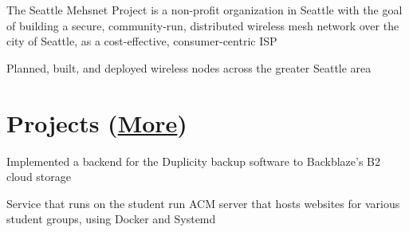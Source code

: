 \documentclass[letterpaper]{deedy-resume} %
\begin{document}
\begin{minipage}[t]{0.66\textwidth}
\sectionspace %



\begin{tightitemize}
\item The Seattle Mehsnet Project is a non-profit organization in Seattle with
  the goal of building a secure, community-run, distributed wireless mesh
  network over the city of Seattle, as a cost-effective, consumer-centric ISP
\item Planned, built, and deployed wireless nodes across the greater Seattle
  area
\end{tightitemize}

\sectionspace %


\section{Projects (\href{https://github.com/matthewbentley?tab=repositories}{More})}


\begin{tightitemize}
\item Implemented a backend for the Duplicity backup software to Backblaze's B2
  cloud storage
\end{tightitemize}

\sectionspace %



\begin{tightitemize}
\item Service that runs on the student run ACM server that hosts websites for
  various student groups, using Docker and Systemd
\end{tightitemize}

\sectionspace %


\end{minipage}
\end{document}
